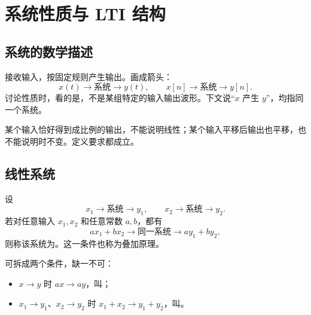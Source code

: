 
\chapter{系统性质与 LTI 结构}
\label{chap:systems-and-lti}

\section{系统的数学描述}
\label{sec:system-description}

接收输入，按固定规则产生输出。画成箭头：
\begin{equation}
  x(t)\longrightarrow\boxed{\text{系统}}\longrightarrow y(t),
  \qquad
  x[n]\longrightarrow\boxed{\text{系统}}\longrightarrow y[n].
  \label{eq:system-flow}
\end{equation}
讨论性质时，看的是，不是某组特定的输入输出波形。下文说“$x$ 产生 $y$”，均指同一个系统。

\begin{pitfall}[拿一组输入输出当证据]
  某个输入恰好得到成比例的输出，不能说明线性；某个输入平移后输出也平移，也不能说明时不变。定义要求都成立。
\end{pitfall}

\section{线性系统}
\label{sec:linear-systems}

\begin{definition}[线性系统]
  \label{def:linear-system}
  设
  \[
    x_1\longrightarrow\boxed{\text{系统}}\longrightarrow y_1,
    \qquad
    x_2\longrightarrow\boxed{\text{系统}}\longrightarrow y_2.
  \]
  若对任意输入 $x_1,x_2$ 和任意常数 $a,b$，都有
  \begin{equation}
    a x_1+b x_2
    \longrightarrow\boxed{\text{同一系统}}\longrightarrow
    a y_1+b y_2,
    \label{eq:linearity-test}
  \end{equation}
  则称该系统为。这一条件也称为叠加原理。
\end{definition}

可拆成两个条件，缺一不可：
\begin{itemize}
  \item $x\longrightarrow y$ 时 $a x\longrightarrow a y$，叫；
  \item $x_1\longrightarrow y_1$、$x_2\longrightarrow y_2$ 时 $x_1+x_2\longrightarrow y_1+y_2$，叫。
\end{itemize}

